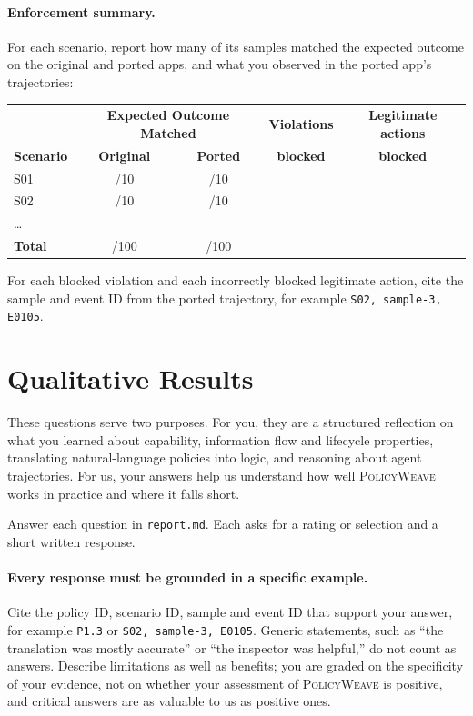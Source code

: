 \documentclass[10pt,letterpaper]{article}
\newcommand{\tool}{\textsc{PolicyWeave}}
\begin{document}
\paragraph{Enforcement summary.} For each scenario, report how many of its
samples matched the expected outcome on the original and ported apps, and what you observed in the
ported app's trajectories:
\begin{center}
\small
\begin{tabular}{|l|c|c|c|c|}
\hline
& \multicolumn{2}{c|}{\textbf{Expected Outcome Matched}}
& \textbf{Violations} & \textbf{Legitimate actions} \\
\textbf{Scenario} & \textbf{Original} & \textbf{Ported}
& \textbf{blocked} & \textbf{blocked} \\
\hline
S01 & /10 & /10 & & \\
S02 & /10 & /10 & & \\
\ldots & & & & \\
\hline
\textbf{Total} & /100 & /100 & & \\
\hline
\end{tabular}
\end{center}
For each blocked violation and each incorrectly blocked legitimate action,
cite the sample and event ID from the ported trajectory, for example
\texttt{S02, sample-3, E0105}.

\section{Qualitative Results}
\label{sec:qual}

These questions serve two purposes. For you, they are a structured reflection
on what you learned about capability, information flow and lifecycle
properties, translating natural-language policies into logic, and reasoning
about agent trajectories. For us, your answers help us understand how well
{\tool} works in practice and where it falls short.

Answer each question in \texttt{report.md}. Each asks for a rating or
selection and a short written response.

\paragraph{Every response must be grounded in a specific example.} Cite the
policy ID, scenario ID, sample and event ID that support your answer, for
example \texttt{P1.3} or \texttt{S02, sample-3, E0105}. Generic statements,
such as ``the translation was mostly accurate'' or ``the inspector was
helpful,'' do not count as answers. Describe limitations as well as benefits;
you are graded on the specificity of your evidence, not on whether your
assessment of {\tool} is positive, and critical answers are as valuable to us
as positive ones.
\end{document}
